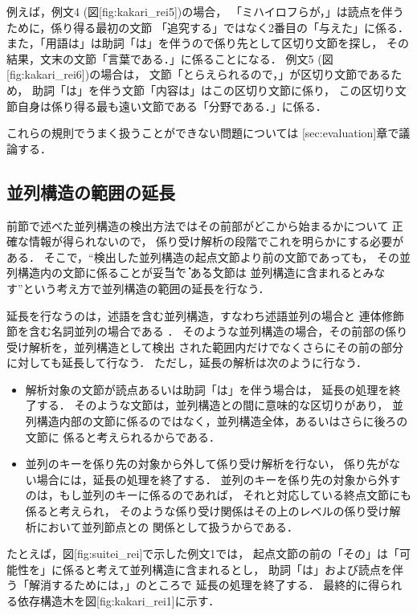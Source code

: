 {\unitlength=1mm
}

{\unitlength=1mm
}

例えば，例文4 (図[fig:kakari_rei5])の場合，
「ミハイロフらが，」は読点を伴うために，係り得る最初の文節
「追究する」ではなく2番目の「与えた」に係る．
また，「用語は」は助詞「は」を伴うので係り先として区切り文節を探し，
その結果，文末の文節「言葉である．」に係ることになる．
例文5 (図[fig:kakari_rei6])の場合は，
文節「とらえられるので，」が区切り文節であるため，
助詞「は」を伴う文節「内容は」はこの区切り文節に係り，
この区切り文節自身は係り得る最も遠い文節である「分野である．」に係る．

これらの規則でうまく扱うことができない問題については
[sec:evaluation]章で議論する．

{\unitlength=1mm
}

\subsection{並列構造の範囲の延長} 

前節で述べた並列構造の検出方法ではその前部がどこから始まるかについて
正確な情報が得られないので，
係り受け解析の段階でこれを明らかにする必要がある．
そこで，``検出した並列構造の起点文節より前の文節であっても，
その並列構造内の文節に係ることが\.{妥}\.{当}\.{で}
\.{あ}\.{る}文節は
並列構造に含まれるとみなす''という考え方で並列構造の範囲の延長を行なう．

延長を行なうのは，述語を含む並列構造，すなわち述語並列の場合と
連体修飾節を含む名詞並列の場合である
．
そのような並列構造の場合，その前部の係り受け解析を，並列構造として検出
された範囲内だけでなくさらにその前の部分に対しても延長して行なう．
ただし，延長の解析は次のように行なう．
\begin{itemize}
  \item 解析対象の文節が読点あるいは助詞「は」を伴う場合は，
延長の処理を終了する．
そのような文節は，並列構造との間に意味的な区切りがあり，
並列構造内部の文節に係るのではなく，並列構造全体，あるいはさらに後ろの文節に
係ると考えられるからである．
  \item 並列のキーを係り先の対象から外して係り受け解析を行ない，
係り先がない場合には，延長の処理を終了する．
並列のキーを係り先の対象から外すのは，もし並列のキーに係るのであれば，
それと対応している終点文節にも係ると考えられ，
そのような係り受け関係はその上のレベルの係り受け解析において並列節点との
関係として扱うからである．
\end{itemize}
たとえば，図[fig:suitei_rei]で示した例文1では，
起点文節の前の「その」は「可能性を」に係ると考えて並列構造に含まれるとし，
助詞「は」および読点を伴う「解消するためには，」のところで
延長の処理を終了する．
最終的に得られる依存構造木を図[fig:kakari_rei1]に示す．

